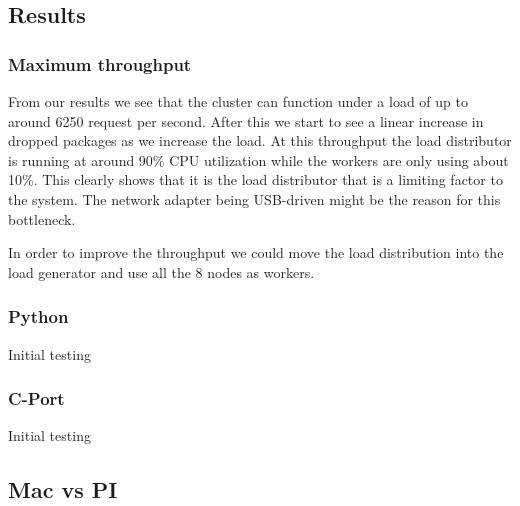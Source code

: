 \subsection{Results}
\subsubsection{Maximum throughput}
From our results we see that the cluster can function under a load of up to around 6250 request per second. After this we start to see a linear increase in dropped packages as we increase the load. At this throughput the load distributor is running at around 90\% CPU utilization while the workers are only using about 10\%. This clearly shows that it is the load distributor that is a limiting factor to the system. The network adapter being USB-driven might be the reason for this bottleneck.

In order to improve the throughput we could move the load distribution into the load generator and use all the 8 nodes as workers.

\subsubsection{Python}
Initial testing

\subsubsection{C-Port}
Initial testing
\subsection{Mac vs PI}

